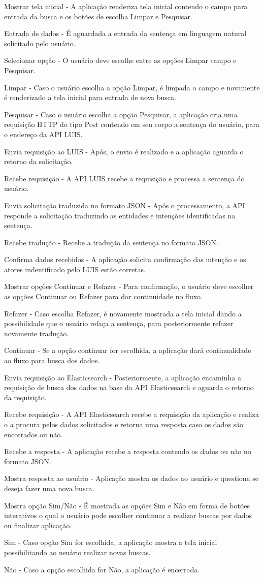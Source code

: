 	Mostrar tela inicial - A aplicação renderiza tela inicial contendo o campo para entrada da busca e os botões de escolha Limpar e Pesquisar.

	Entrada de dados - É aguardada a entrada da sentença em linguagem natural solicitado pelo usuário.

	Selecionar opção - O usuário deve escolhe entre as opções Limpar campo e Pesquisar.

	Limpar - Caso o usuário escolha a opção Limpar, é limpada o campo e novamente é renderizado a tela inicial para entrada de nova busca.

	Pesquisar - Caso o usuário escolha a opção Pesquisar, a aplicação cria uma requisição HTTP do tipo Post contendo em seu corpo a sentença do usuário, para o endereço da API LUIS.

	Envia requisição ao LUIS - Após, o envio é realizado e a aplicação aguarda o retorno da solicitação.

	Recebe requisição - A API LUIS recebe a requisição e processa a sentença do usuário.

	Envia solicitação traduzida no formato JSON - Após o processamento, a API responde a solicitação traduzindo as entidades e intenções identificadas na sentença.

	Recebe tradução - Recebe a tradução da sentença no formato JSON.

	Confirma dados recebidos - A aplicação solicita confirmação das intenção e os atores indentificado pelo LUIS estão corretas.

	Mostrar opções Continuar e Refazer - Para confirmação, o usuário deve escolher as opções Continuar ou Refazer para dar continuidade no fluxo.

	Refazer - Caso escolha Refazer, é novamente mostrada a tela inicial dando a possibilidade que o usuário refaça a sentença, para posteriormente refazer novamente tradução.

	Continuar - Se a opção continuar for escolhida, a aplicação dará continualidade ao fluxo para busca dos dados.

	Envia requisição ao Elasticsearch - Posteriormente, a aplicação encaminha a requisição  de busca dos dados na base da API Elasticsearch e aguarda o retorno da requisição.

	Recebe requisição - A API Elasticsearch recebe a requisição da aplicação e realiza o a procura pelos dados solicitados e retorna uma resposta caso os dados são encotrados ou não.

	Recebe a resposta - A aplicação recebe a resposta contendo os dados ou não no formato JSON.

	Mostra resposta ao usuário - Aplicação mostra os dados ao usuário e questiona se deseja fazer uma nova busca.

	Mostra opção Sim/Não - É mostrada as opções Sim e Nâo em forma de botões interativos o qual o usuário pode escolher continuar a realizar buscas por dados ou finalizar aplicação.

	Sim - Caso opção Sim for escolhida, a aplicação mostra a tela inicial possibilitando ao usuário realizar novas buscas.

	Não - Caso a opção escolhida for Não, a aplicação é encerrada.

